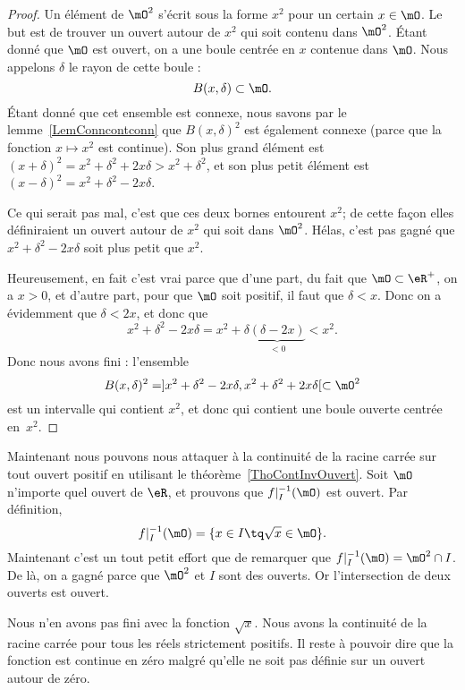 \begin{proof}
Un élément de $\mO^2$ s'écrit sous la forme $x^2$ pour un certain $x\in\mO$. Le but est de trouver un ouvert autour de $x^2$ qui soit contenu dans $\mO^2$. Étant donné que $\mO$ est ouvert, on a une boule centrée en $x$ contenue dans $\mO$. Nous appelons $\delta$ le rayon de cette boule :
\[
  B(x,\delta)\subset\mO.
\]
Étant donné que cet ensemble est connexe, nous savons par le lemme~\ref{LemConncontconn} que $B(x,\delta)^2$ est également connexe (parce que la fonction $x\mapsto x^2$ est continue). Son plus grand élément est $(x+\delta)^2=x^2+\delta^2+2x\delta>x^2+\delta^2$, et son plus petit élément est $(x-\delta)^2=x^2+\delta^2-2x\delta$.

Ce qui serait pas mal, c'est que ces deux bornes entourent $x^2$; de cette façon elles définiraient un ouvert autour de $x^2$ qui soit dans $\mO^2$. Hélas, c'est pas gagné que $x^2+\delta^2-2x\delta$ soit plus petit que $x^2$.

Heureusement, en fait c'est vrai parce que d'une part, du fait que $\mO\subset\eR^+$, on a $x>0$, et d'autre part, pour que $\mO$ soit positif, il faut que $\delta<x$. Donc on a évidemment que $\delta<2x$, et donc que
\[
  x^2+\delta^2-2x\delta=x^2+\delta\underbrace{(\delta-2x)}_{<0}<x^2.
\]
Donc nous avons fini : l'ensemble
\[
  B(x,\delta)^2=]x^2+\delta^2-2x\delta,x^2+\delta^2+2x\delta[\subset\mO^2
\]
est un intervalle qui contient $x^2$, et donc qui contient une boule ouverte centrée en~$x^2$.

\end{proof}

Maintenant nous pouvons nous attaquer à la continuité de la racine carrée sur tout ouvert positif en utilisant le théorème~\ref{ThoContInvOuvert}. Soit $\mO$ n'importe quel ouvert de $\eR$, et prouvons que $f|_I^{-1}(\mO)$ est ouvert. Par définition,
\begin{equation}
  f|_I^{-1}(\mO)=\{ x\in I\tq \sqrt{x}\in\mO \}.
\end{equation}
Maintenant c'est un tout petit effort que de remarquer que $f|_I^{-1}(\mO)=\mO^2\cap I$. De là, on a gagné parce que $\mO^2$ et $I$ sont des ouverts. Or l'intersection de deux ouverts est ouvert.

Nous n'en avons pas fini avec la fonction $\sqrt{x}$. Nous avons la continuité de la racine carrée pour tous les réels strictement positifs. Il reste à pouvoir dire que la fonction est continue en zéro malgré qu'elle ne soit pas définie sur un ouvert autour de zéro.

